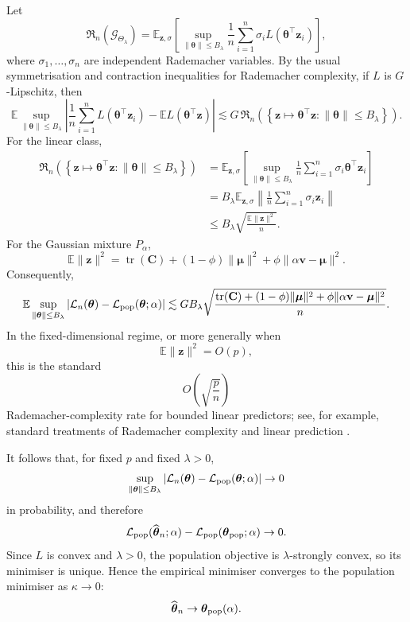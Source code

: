 \documentclass[11pt]{article}
\DeclareMathOperator{\tr}{tr}
\newcommand{\EE}{\mathbb{E}}
\newcommand{\C}{\mathbf{C}}
\newcommand{\bv}{\mathbf{v}}
\newcommand{\bmu}{\boldsymbol{\mu}}
\newcommand{\btheta}{\boldsymbol{\theta}}
\begin{document}
Let
\[
\mathfrak R_n(\mathcal G_{\Theta_\lambda})
=
\EE_{\mathbf{z},\sigma}
\left[
\sup_{\|\btheta\|\leq B_\lambda}
\frac1n
\sum_{i=1}^n
\sigma_i
L(\btheta^\top \mathbf{z}_i)
\right],
\]
where \(\sigma_1,\dots,\sigma_n\) are independent Rademacher variables. By the usual symmetrisation and contraction inequalities for Rademacher complexity, if \(L\) is \(G\)-Lipschitz, then
\[
\EE
\sup_{\|\btheta\|\leq B_\lambda}
\left|
\frac1n\sum_{i=1}^n L(\btheta^\top \mathbf{z}_i)
-
\EE L(\btheta^\top \mathbf{z})
\right|
\lesssim
G\,
\mathfrak R_n
\left(
\left\{
\mathbf{z}\mapsto \btheta^\top \mathbf{z}:
\|\btheta\|\leq B_\lambda
\right\}
\right).
\]
For the linear class,
\[
\begin{aligned}
\mathfrak R_n
\left(
\left\{
\mathbf{z}\mapsto \btheta^\top \mathbf{z}:
\|\btheta\|\leq B_\lambda
\right\}
\right)
&=
\EE_{\mathbf{z},\sigma}
\left[
\sup_{\|\btheta\|\leq B_\lambda}
\frac1n
\sum_{i=1}^n
\sigma_i
\btheta^\top \mathbf{z}_i
\right]
\\
&=
B_\lambda
\EE_{\mathbf{z},\sigma}
\left\|
\frac1n
\sum_{i=1}^n
\sigma_i \mathbf{z}_i
\right\|
\\
&\leq
B_\lambda
\sqrt{
\frac{\EE\|\mathbf{z}\|^2}{n}
}.
\end{aligned}
\]
For the Gaussian mixture \(P_\alpha\),
\[
\EE\|\mathbf{z}\|^2
=
\tr(\C)
+
(1-\phi)\|\bmu\|^2
+
\phi\|\alpha\bv-\bmu\|^2.
\]
Consequently,
\[
\EE
\sup_{\|\btheta\|\leq B_\lambda}
\left|
\mathcal L_n(\btheta)
-
\mathcal L_{\rm pop}(\btheta;\alpha)
\right|
\lesssim
G B_\lambda
\sqrt{
\frac{
\tr(\C)
+
(1-\phi)\|\bmu\|^2
+
\phi\|\alpha\bv-\bmu\|^2
}{n}
}.
\]
In the fixed-dimensional regime, or more generally when
\[
\EE\|\mathbf{z}\|^2 = O(p),
\]
this is the standard
\[
O\left(\sqrt{\frac{p}{n}}\right)
\]
Rademacher-complexity rate for bounded linear predictors; see, for example,
standard treatments of Rademacher complexity and linear prediction
\citep{mohriFoundationsMachineLearning2018}.

It follows that, for fixed \(p\) and fixed \(\lambda>0\),
\[
\sup_{\|\btheta\|\leq B_\lambda}
\left|
\mathcal L_n(\btheta)
-
\mathcal L_{\rm pop}(\btheta;\alpha)
\right|
\to 0
\]
in probability, and therefore
\[
\mathcal L_{\rm pop}(\widehat{\btheta}_n;\alpha)
-
\mathcal L_{\rm pop}(\btheta_{\rm pop};\alpha)
\to 0.
\]
Since \(L\) is convex and \(\lambda>0\), the population objective is
\(\lambda\)-strongly convex, so its minimiser is unique. Hence the empirical minimiser converges to the population minimiser as $\kappa \rightarrow 0$:
\[
\widehat{\btheta}_n
\to
\btheta_{\rm pop}(\alpha).
\]
\end{document}
